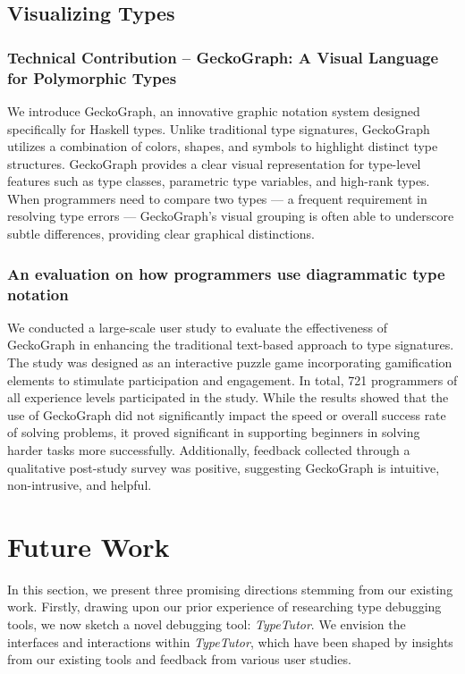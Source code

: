 \subsection{Visualizing Types}

\subsubsection{Technical Contribution -- GeckoGraph: A Visual Language for Polymorphic Types}

We introduce GeckoGraph, an innovative graphic notation system designed specifically for Haskell types. Unlike traditional type signatures, GeckoGraph utilizes a combination of colors, shapes, and symbols to highlight distinct type structures. GeckoGraph provides a clear visual representation for type-level features such as type classes, parametric type variables, and high-rank types. When programmers need to compare two types — a frequent requirement in resolving type errors — GeckoGraph's visual grouping is often able to underscore subtle differences, providing clear graphical distinctions.

\subsubsection{An evaluation on how programmers use diagrammatic type notation}

We conducted a large-scale user study to evaluate the effectiveness of GeckoGraph in enhancing the traditional text-based approach to type signatures. The study was designed as an interactive puzzle game incorporating gamification elements to stimulate participation and engagement. In total,  721 programmers of all experience levels participated in the study. While the results showed that the use of GeckoGraph did not significantly impact the speed or overall success rate of solving problems, it proved significant in supporting beginners in solving harder tasks more successfully. Additionally, feedback collected through a qualitative post-study survey was positive, suggesting GeckoGraph is intuitive, non-intrusive, and helpful.

\section{Future Work}

In this section, we present three promising directions stemming from our existing work. Firstly, drawing upon our prior experience of researching type debugging tools, we now sketch a novel debugging tool: \textit{TypeTutor}. We envision the interfaces and interactions within \textit{TypeTutor}, which have been shaped by insights from our existing tools and feedback from various user studies.

